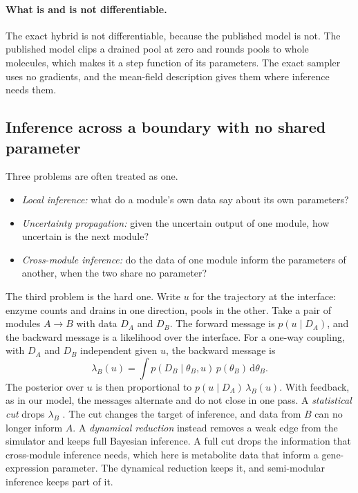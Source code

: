 \paragraph{What is and is not differentiable.} The exact hybrid is not
differentiable, because the published model is not. The published model clips a drained pool
at zero and rounds pools to whole molecules, which makes it a step function of its parameters.
The exact sampler uses no gradients, and the mean-field description gives them where inference
needs them.

\subsection{Inference across a boundary with no shared parameter}
\label{sec:seam}

Three problems are often treated as one.
\begin{itemize}
  \item \emph{Local inference:} what do a module's own data say about its own
  parameters?
  \item \emph{Uncertainty propagation:} given the uncertain output of one module,
  how uncertain is the next module?
  \item \emph{Cross-module inference:} do the data of one module inform the
  parameters of another, when the two share no parameter?
\end{itemize}
The third problem is the hard one. Write $u$ for the trajectory at the interface: enzyme
counts and drains in one direction, pools in the other. Take a pair of modules $A \to B$ with
data $D_A$ and $D_B$. The forward message is $p(u \mid D_A)$, and the backward message is a
likelihood over the interface. For a one-way coupling, with $D_A$ and $D_B$ independent
given $u$, the backward message is
\begin{equation}
  \lambda_B(u) = \int p(D_B \mid \theta_B, u)\, p(\theta_B)\, \mathrm{d}\theta_B .
\end{equation}
The posterior over $u$ is then proportional to $p(u \mid D_A)\,\lambda_B(u)$. With feedback,
as in our model, the messages alternate and do not close in one pass. A
\emph{statistical cut} drops $\lambda_B$ \cite{plummer2015cuts}. The cut changes the
target of inference, and data from $B$ can no longer inform $A$. A \emph{dynamical
reduction} instead removes a weak edge from the simulator and keeps full Bayesian
inference. A full cut drops the information that cross-module inference needs, which here
is metabolite data that inform a gene-expression parameter. The dynamical reduction keeps
it, and semi-modular inference \cite{carmona2020semimodular} keeps part of it.

